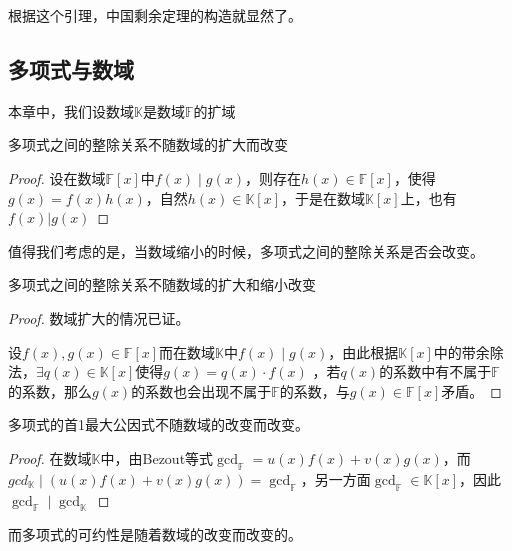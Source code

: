 \documentclass{ctexart}
\begin{document}
根据这个引理，中国剩余定理的构造就显然了。

\subsection{多项式与数域}
本章中，我们设数域$\mathbb{K}$是数域$\mathbb{F}$的扩域
\begin{theorem}
    多项式之间的整除关系不随数域的扩大而改变
\end{theorem}
\begin{proof}
    设在数域$\mathbb{F}[x]$中$f(x) \mid g(x)$，则存在$h(x) \in \mathbb{F}[x]$，使得$g(x) = f(x)h(x)$，自然$h(x) \in \mathbb{K}[x]$，于是在数域$\mathbb K[x]$上，也有$f(x) | g(x)$ 
\end{proof}

值得我们考虑的是，当数域缩小的时候，多项式之间的整除关系是否会改变。

\begin{theorem}
    多项式之间的整除关系不随数域的扩大和缩小改变
\end{theorem}

\begin{proof}
    数域扩大的情况已证。
    
    设$f(x),g(x) \in \mathbb{F}[x]$而在数域$\mathbb K$中$f(x) \mid g(x)$，由此根据$\mathbb{K}[x]$中的带余除法，$\exists q(x) \in \mathbb{K}[x]$使得$g(x) = q(x)\cdot f(x)$ ，若$q(x)$的系数中有不属于$\mathbb F$的系数，那么$g(x)$的系数也会出现不属于$\mathbb F$的系数，与$g(x)\in \mathbb{F}[x]$矛盾。
\end{proof}


\begin{theorem}
    多项式的首1最大公因式不随数域的改变而改变。
\end{theorem}

\begin{proof}
    在数域$\mathbb{K}$中，由Bezout等式$\gcd_{\mathbb F} = u(x)f(x) + v(x)g(x)$，而$gcd_{\mathbb K} \mid (u(x)f(x) + v(x)g(x)) = \gcd_{\mathbb{F}}$，另一方面$\gcd_{\mathbb{F}} \in \mathbb{K}[x]$，因此$\gcd_{\mathbb{F}} \mid \gcd_{\mathbb{K}}$
\end{proof}

而多项式的可约性是随着数域的改变而改变的。
\end{document}
